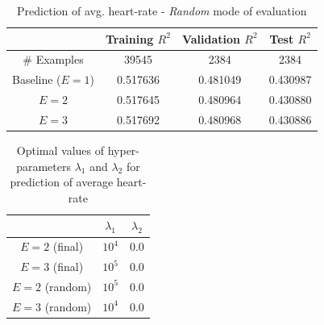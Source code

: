 \documentclass{acm_proc_article-sp}
\begin{document}
\begin{table}[h]
\centering
\begin{tabular}{|c|c|c|c|} \hline
& Training $R^2$ & Validation $R^2$ & Test $R^2$ \\ \hline
\# Examples & 39545 & 2384  &  2384 \\ \hline
Baseline ($E = 1$) & 0.517636 & 0.481049 & 0.430987 \\ \hline
$E = 2$  & 0.517645 & 0.480964 & 0.430880 \\ \hline
$E = 3$  & 0.517692 & 0.480968 & 0.430886 \\ \hline
\end{tabular}
\caption{Prediction of avg. heart-rate - \emph{Random} mode of evaluation }
\label{tableAvgHrRandom}
\end{table}

\begin{table}[h]
\centering
\begin{tabular}{|c|c|c|} \hline
& $\lambda_1$ & $\lambda_2$ \\ \hline
$E = 2$ (final) & $10^4$ & $0.0$ \\ \hline
$E = 3$ (final) & $10^5$ & $0.0$ \\ \hline
$E = 2$ (random) & $10^5$ & $0.0$ \\ \hline
$E = 3$ (random) & $10^4$ & $0.0$ \\ \hline
\end{tabular}
\caption{Optimal values of hyper-parameters $\lambda_1$ and $\lambda_2$ for prediction of average heart-rate}
\label{tableAvgHrHyperparams}
\end{table}
\end{document}
